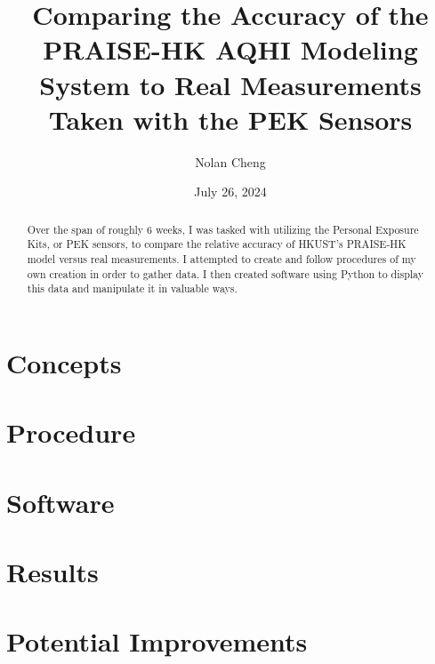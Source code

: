 \documentclass{article}
\title{Comparing the Accuracy of the PRAISE-HK AQHI Modeling System to 
Real Measurements Taken with the PEK Sensors}
\author{Nolan Cheng}
\date{July 26, 2024}
\begin{document}
\maketitle
\begin{multicols}{2}

\begin{abstract}
    Over the span of roughly 6 weeks, I was tasked with utilizing the 
    Personal Exposure Kits, or PEK sensors, to compare the relative accuracy 
    of HKUST's PRAISE-HK model versus real measurements. I attempted to create 
    and follow procedures of my own creation in order to gather data. I then
    created software using Python to display this data and manipulate it 
    in valuable ways.
\end{abstract}

\section{Concepts}
\label{section:Concepts}

\section{Procedure}
\label{section:Procedure}

\section{Software}
\label{section:Software}

\section{Results}
\label{section:Results}

\section{Potential Improvements}
\label{section:PotentialImprovements}

\end{multicols}
\end{document}

